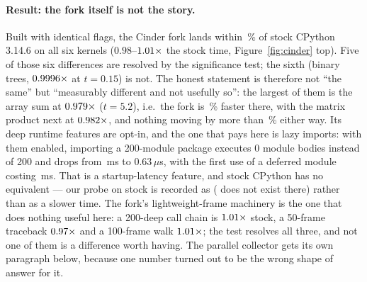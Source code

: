 \paragraph{Result: the fork itself is not the story.}
Built with identical flags, the Cinder fork lands within \,\% of stock CPython 3.14.6 on all
six kernels ($0.98$--$\meas{ratio:b6_cinderx-fork:mandelbrot/fork|b6_cinderx-stock:mandelbrot/stock}{1.01}\times$ the stock time, Figure~\ref{fig:cinder} top). Five of those
six differences are resolved by the significance test; the sixth (binary trees, $\meas{ratio:b6_cinderx-fork:binarytrees/fork|b6_cinderx-stock:binarytrees/stock}{0.9996}\times$ at
$t=0.15$) is not. The honest statement
is therefore not ``the same'' but ``measurably different and not usefully so'': the largest of them is
the array sum at $\meas{ratio:b6_cinderx-fork:arraysum/fork|b6_cinderx-stock:arraysum/stock}{0.979}\times$ ($t=5.2$), i.e.\ the fork is \,\% faster there, with the
matrix product next at $\meas{ratio:b6_cinderx-fork:matmul/fork|b6_cinderx-stock:matmul/stock}{0.982}\times$, and nothing moving by more than \,\% either way. Its deep runtime features are
opt-in, and the one that pays here is lazy imports: with them enabled, importing a 200-module
package executes 0 module bodies instead of 200 and drops from \,ms to 0.63\,$\mu$s, with
the first use of a deferred module costing \,ms. That is a startup-latency feature, and
stock CPython has no equivalent --- our probe on stock is recorded as 
( does not exist there) rather than as a slower time. The
fork's lightweight-frame machinery is the one that does nothing useful here: a 200-deep call
chain is $\meas{ratio:b6_cinderx-fork:call_depth_200/fork|b6_cinderx-stock:call_depth_200/stock}{1.01}\times$ stock, a 50-frame traceback $\meas{ratio:b6_cinderx-fork:traceback_depth_50/fork|b6_cinderx-stock:traceback_depth_50/stock}{0.97}\times$ and a 100-frame walk
$\meas{ratio:b6_cinderx-fork:frame_walk_depth_100/fork|b6_cinderx-stock:frame_walk_depth_100/stock}{1.01}\times$; the test resolves all three, and not one of them is a difference worth
having. The parallel collector
gets its own paragraph below, because one number turned out to be the wrong shape of answer for
it.

